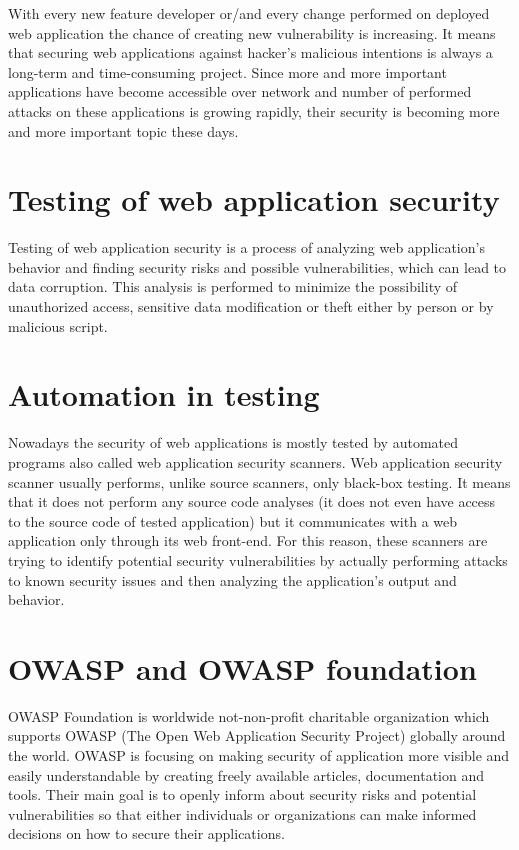 	With every new feature developer or/and every change performed on deployed web application the chance of creating new vulnerability is increasing. It means that securing web applications against hacker's malicious intentions is always a long-term and time-consuming project. Since more and more important applications have become accessible over network and number of performed attacks on these applications is growing rapidly, their security is becoming more and more important topic these days.
	
	\section{Testing of web application security}
	
	Testing of web application security is a process of analyzing web application's behavior and finding security risks and possible vulnerabilities, which can lead to data corruption. 
	This analysis is performed to minimize the possibility of unauthorized access, sensitive data modification or theft either by person or by malicious script.
	
	\section{Automation in testing}
	
	Nowadays the security of web applications is mostly tested by automated programs also called web application security scanners. Web application security scanner usually performs, unlike source scanners, only black-box testing. It means that it does not perform any source code analyses (it does not even have access to the source code of tested application) but it communicates with a web application only through its web front-end. For this reason, these scanners are trying to identify potential security vulnerabilities by actually performing attacks to known security issues and then analyzing the application's output and behavior.
	
	\section{OWASP and OWASP foundation}\label{OWASP}
		
	OWASP Foundation is worldwide not-non-profit charitable organization \cite{OWASP} which supports OWASP (The Open Web Application Security Project) globally around the world. OWASP is focusing on making security of application more visible and easily understandable by creating freely available articles, documentation and tools. Their main goal is to openly inform about security risks and potential vulnerabilities so that either individuals or organizations can make informed decisions on how to secure their applications.

